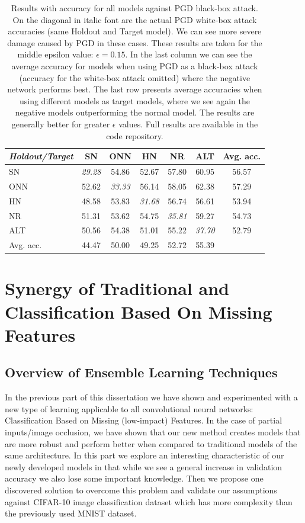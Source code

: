 \documentclass[b5paper]{book}
\begin{document}
\begin{table}[ht]
  \centering
  \begin{tabular}{l|ccccc|c}
    \toprule
     \textit{Holdout/Target} & SN & ONN & HN & NR & ALT & {Avg. acc.} \\
    \midrule
     SN & \textit{{29.28}} & {54.86} & {52.67} & {57.80} & {60.95} & {56.57} \\
     ONN & {52.62} & \textit{{33.33}} & {56.14} & {58.05} & {62.38} & {57.29} \\
     HN & {48.58} & {53.83} & \textit{{31.68}} & {56.74} & {56.61} & {53.94} \\
     NR &{51.31} & {53.62} & {54.75} & \textit{{35.81}} & {59.27} & {54.73}\\ 
     ALT & {50.56} & {54.38} & {51.01} & {55.22} & \textit{{37.70}} & {52.79}\\
    \midrule 
     Avg. acc. & {44.47} & {50.00} & {49.25} & {52.72} & {55.39} \\
    \bottomrule
  \end{tabular}
  \caption{Results with accuracy for all models against PGD black-box attack. On the diagonal in italic font are the actual PGD white-box attack accuracies (same Holdout and Target model). We can see more severe damage caused by PGD in these cases. These results are taken for the middle epsilon value: \(\epsilon = 0.15 \). In the last column we can see the average accuracy for models when using PGD as a black-box attack (accuracy for the white-box attack omitted) where the negative network performs best. The last row presents average accuracies when using different models as target models, where we see again the negative models outperforming the normal model. The results are generally better for greater \(\epsilon\) values. Full results are available in the code repository.}
  \label{tab:results-pgd}
\end{table} 

\part{Synergy of Traditional and Classification Based On Missing Features}
\chapter{Overview of Ensemble Learning Techniques}

In the previous part of this dissertation we have shown and experimented with a new type of learning applicable to all convolutional neural networks: Classification Based on Missing (low-impact) Features. In the case of partial inputs/image occlusion, we have shown that our new method creates models that are more robust and perform better when compared to traditional models of the same architecture. In this part we explore an interesting characteristic of our newly developed models in that while we see a general increase in validation accuracy we also lose some important knowledge. Then we propose one discovered solution to overcome this problem and validate our assumptions against CIFAR-10 image classification dataset which has more complexity than the previously used MNIST dataset.
\end{document}
